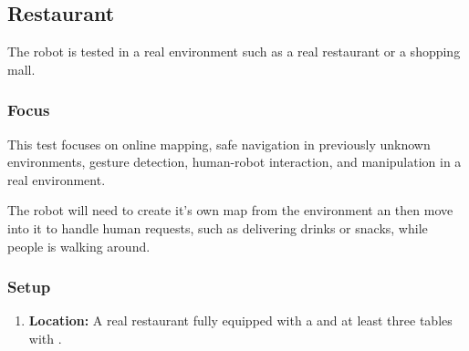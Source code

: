 \subsection{Restaurant}
The robot is tested in a real environment such as a real restaurant or a shopping mall.

\subsubsection{Focus}
This test focuses on online mapping, safe navigation in previously unknown environments, gesture detection, human-robot interaction, and manipulation in a real environment.

The robot will need to create it's own map from the environment an then move into it to handle human requests, such as delivering drinks or snacks, while people is walking around.

\subsubsection{Setup}
\begin{enumerate}
\item \textbf{Location:} A real restaurant fully equipped with a  and at least three tables with . 
\end{enumerate}

